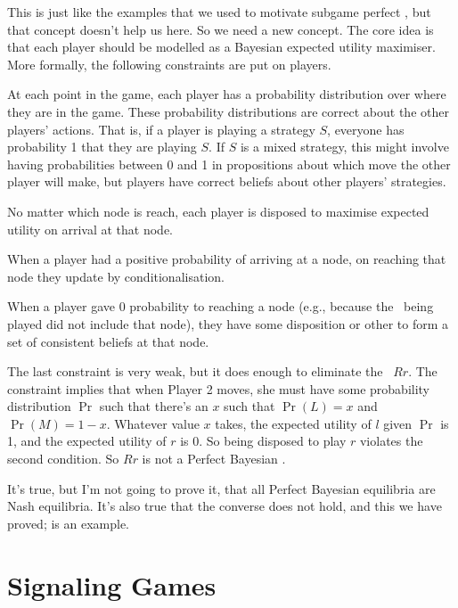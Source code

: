 This is just like the examples that we used to motivate subgame perfect \eqm, but that concept doesn't help us here. So we need a new concept. The core idea is that each player should be modelled as a Bayesian expected utility maximiser. More formally, the following constraints are put on players.

\begin{enumerate*}
\item At each point in the game, each player has a probability distribution over where they are in the game. These probability distributions are correct about the other players' actions. That is, if a player is playing a strategy $S$, everyone has probability 1 that they are playing $S$. If $S$ is a mixed strategy, this might involve having probabilities between 0 and 1 in propositions about which move the other player will make, but players have correct beliefs about other players' strategies.
\item No matter which node is reach, each player is disposed to maximise expected utility on arrival at that node.
\item When a player had a positive probability of arriving at a node, on reaching that node they update by conditionalisation.
\item When a player gave 0 probability to reaching a node (e.g., because the \eqm\ being played did not include that node), they have some disposition or other to form a set of consistent beliefs at that node.
\end{enumerate*}

\noindent The last constraint is very weak, but it does enough to eliminate the \eqm\ $Rr$. The constraint implies that when Player 2 moves, she must have some probability distribution $\Pr$ such that there's an $x$ such that $\Pr(L) = x$ and $\Pr(M) = 1-x$. Whatever value $x$ takes, the expected utility of $l$ given $\Pr$ is 1, and the expected utility of $r$ is 0. So being disposed to play $r$ violates the second condition. So $Rr$ is not a Perfect Bayesian \eqm.

It's true, but I'm not going to prove it, that all Perfect Bayesian equilibria are Nash equilibria. It's also true that the converse does not hold, and this we have proved;  is an example.

\chapter{Signaling Games}

